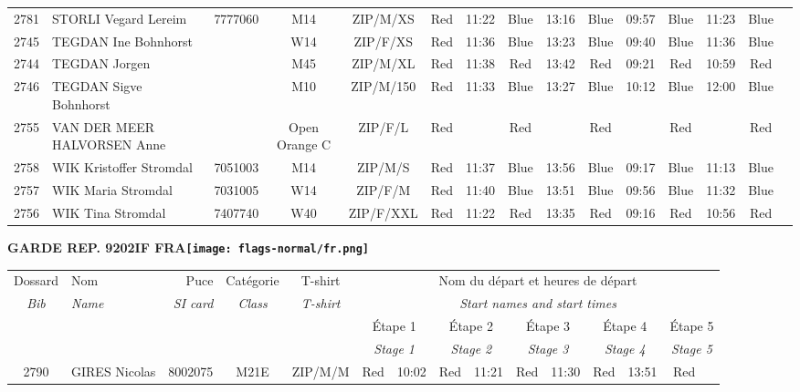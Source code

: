 \documentclass{report}
\begin{document}
\begin{longtable}{|c|l|r|c|c|*{5}{cc|}}
    2781 & STORLI Vegard Lereim & 7777060 & M14 & ZIP/M/XS & Red & 11:22 & Blue & 13:16 & Blue & 09:57 & Blue & 11:23 & Blue &  \\
    2745 & TEGDAN Ine Bohnhorst &  & W14 & ZIP/F/XS & Red & 11:36 & Blue & 13:23 & Blue & 09:40 & Blue & 11:36 & Blue &  \\
    2744 & TEGDAN Jorgen &  & M45 & ZIP/M/XL & Red & 11:38 & Red & 13:42 & Red & 09:21 & Red & 10:59 & Red &  \\
    2746 & TEGDAN Sigve Bohnhorst &  & M10 & ZIP/M/150 & Red & 11:33 & Blue & 13:27 & Blue & 10:12 & Blue & 12:00 & Blue &  \\
    2755 & VAN DER MEER HALVORSEN Anne &  & Open Orange C & ZIP/F/L & Red &   & Red &   & Red &   & Red &   & Red &  \\
    2758 & WIK Kristoffer Stromdal & 7051003 & M14 & ZIP/M/S & Red & 11:37 & Blue & 13:56 & Blue & 09:17 & Blue & 11:13 & Blue &  \\
    2757 & WIK Maria Stromdal & 7031005 & W14 & ZIP/F/M & Red & 11:40 & Blue & 13:51 & Blue & 09:56 & Blue & 11:32 & Blue &  \\
    2756 & WIK Tina Stromdal & 7407740 & W40 & ZIP/F/XXL & Red & 11:22 & Red & 13:35 & Red & 09:16 & Red & 10:56 & Red &  \\
  \end{longtable}
\newpage
  \Huge \centering \bfseries GARDE REP. 9202IF FRA\normalfont \footnotesize \sffamily \hfill \texttt{[image: flags-normal/fr.png]} \newline 
  \begin{longtable}{|c|l|r|c|c|*{5}{cc|}}
    Dossard & Nom  & Puce    & Catégorie & T-shirt & \multicolumn{10}{c|}{Nom du départ et heures de départ} \\
    \itshape Bib     & \itshape Name & \itshape SI card & \itshape Class  & \itshape  T-shirt  & \multicolumn{10}{c|}{\itshape Start names and start times} \\
    \hline
    & & & & & \multicolumn{2}{c|}{Étape 1} & \multicolumn{2}{c|}{Étape 2} & \multicolumn{2}{c|}{Étape 3} & \multicolumn{2}{c|}{Étape 4} & \multicolumn{2}{c|}{Étape 5} \\
    & & & & & \multicolumn{2}{c|}{\itshape Stage 1} & \multicolumn{2}{c|}{\itshape Stage 2} & \multicolumn{2}{c|}{\itshape Stage 3} & \multicolumn{2}{c|}{\itshape Stage 4} & \multicolumn{2}{c|}{\itshape Stage 5} \\
    \hline
    2790 & GIRES Nicolas & 8002075 & M21E & ZIP/M/M & Red & 10:02 & Red & 11:21 & Red & 11:30 & Red & 13:51 & Red &  \\
  \end{longtable}
\end{document}
